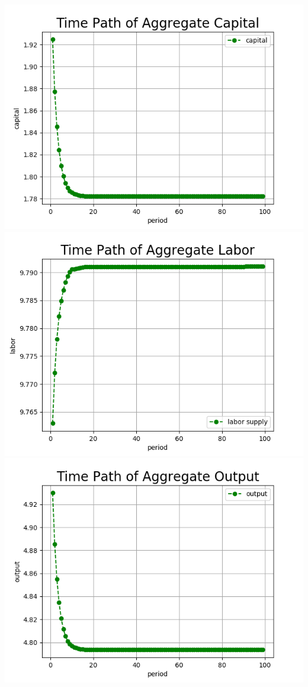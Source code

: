 \documentclass[letterpaper,12pt]{article}
\theoremstyle{definition}
\begin{document}
\includegraphics[scale=0.35]{images_TPI/tpi_K}
\includegraphics[scale=0.35]{images_TPI/tpi_L}
\includegraphics[scale=0.35]{images_TPI/tpi_Y}
\end{document}
